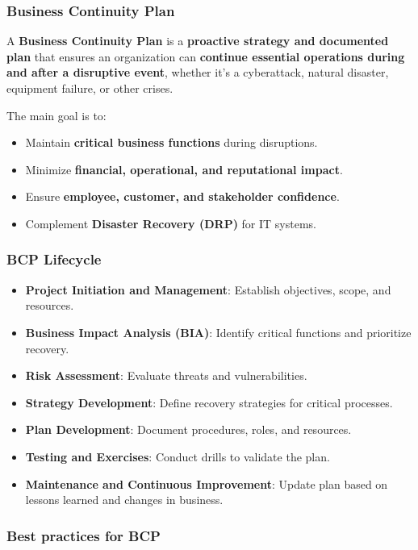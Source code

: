 \subsubsection{Business Continuity Plan}

\indent 

A \textbf{Business Continuity Plan} is a \textbf{proactive strategy and documented plan} that ensures an organization can \textbf{continue essential operations during and after a disruptive event}, whether it’s a cyberattack, natural disaster, equipment failure, or other crises.

The main goal is to:

\begin{itemize}
    \item Maintain \textbf{critical business functions} during disruptions.
    \item Minimize \textbf{financial, operational, and reputational impact}.
    \item Ensure \textbf{employee, customer, and stakeholder confidence}.
    \item Complement \textbf{Disaster Recovery (DRP)} for IT systems.
\end{itemize}

\subsubsection{BCP Lifecycle}

\begin{itemize}
    \item \textbf{Project Initiation and Management}: Establish objectives, scope, and resources.
    \item \textbf{Business Impact Analysis (BIA)}: Identify critical functions and prioritize recovery.
    \item \textbf{Risk Assessment}: Evaluate threats and vulnerabilities.
    \item \textbf{Strategy Development}: Define recovery strategies for critical processes.
    \item \textbf{Plan Development}: Document procedures, roles, and resources.
    \item \textbf{Testing and Exercises}: Conduct drills to validate the plan.
    \item \textbf{Maintenance and Continuous Improvement}: Update plan based on lessons learned and changes in business.
\end{itemize}

\subsubsection{Best practices for BCP}

